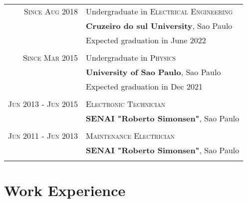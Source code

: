 \documentclass[a4paper,10pt]{article} %
\begin{document}
\begin{tabular}{rl}	

\textsc{Since Aug} 2018 & Undergraduate in \textsc{Electrical Engineering}\\ &\textbf{Cruzeiro do sul University}, Sao Paulo\\
&Expected graduation in June 2022\\
\\


\textsc{Since Mar} 2015 & Undergraduate in \textsc{Physics}\\
&\textbf{University of Sao Paulo}, Sao Paulo\\
&Expected graduation in Dec 2021\\
\\


\textsc{Jun} 2013 - \textsc{Jun} 2015 & \textsc{Electronic Technician}\\ 
&\textbf{SENAI "Roberto Simonsen"}, Sao Paulo\\
\\


\textsc{Jun} 2011 - \textsc{Jun} 2013  & \textsc{Maintenance Electrician}\\ 
&\textbf{SENAI "Roberto Simonsen"}, Sao Paulo\\
\\


\end{tabular}


\section{Work Experience}
\end{document}
